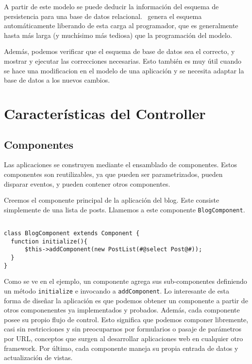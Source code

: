 A partir de este modelo se puede deducir la información del esquema de persistencia para una base de datos relacional. \PWB \ genera el esquema automáticamente liberando de esta carga al programador, que es generalmente hasta más larga (y muchísimo más tediosa) que la programación del modelo.

Además, podemos verificar que el esquema de base de datos sea el correcto, y mostrar y ejecutar las correcciones necesarias. Esto también es muy útil cuando se hace una modificacion en el modelo de una aplicación y se necesita adaptar la base de datos a los nuevos cambios.

\section{Características del Controller}
\label{sec-controller}
\subsection{Componentes}
\label{sub-comp}

Las aplicaciones se construyen mediante el ensamblado de componentes. Estos componentes son reutilizables, ya que pueden ser parametrizados, pueden disparar eventos, y pueden contener otros componentes.

Creemos el componente principal de la aplicación del blog. Este consiste simplemente de una lista de posts. Llamemos a este componente \verb"BlogComponent".

\begin{verbatim}

class BlogComponent extends Component {
  function initialize(){
      $this->addComponent(new PostList(#@select Post@#));
  }
}
\end{verbatim}

Como se ve en el ejemplo, un componente agrega sus sub-componentes definiendo un método \verb"initialize" e invocando a \verb"addComponent". Lo interesante de esta forma de diseñar la aplicación es que podemos obtener un componente a partir de otros componenentes ya implementados y probados. Además, cada componente posee su propio flujo de control. Esto significa que podemos componer libremente, casi sin restricciones y sin preocuparnos por formularios o pasaje de parámetros por URL, conceptos que surgen al desarrollar aplicaciones web en cualquier otro framework. Por último, cada componente maneja su propia entrada de datos y actualización de vistas.

